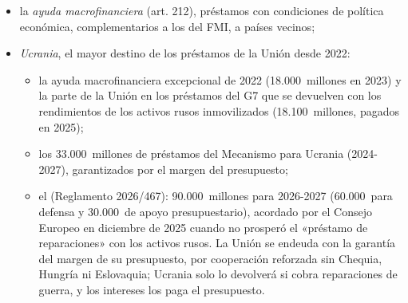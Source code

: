 \documentclass[11pt]{article}
\begin{document}
\begin{itemize}
\begin{itemize}
  \item la \emph{ayuda macrofinanciera} (art. 212), préstamos con condiciones de política económica, complementarios a los del FMI, a países vecinos;
  \item \emph{Ucrania}, el mayor destino de los préstamos de la Unión desde 2022:
    \begin{itemize}
    \item la ayuda macrofinanciera excepcional de 2022 (18.000~millones en 2023) y la parte de la Unión en los préstamos del G7 que se devuelven con los rendimientos de los activos rusos inmovilizados (18.100~millones, pagados en 2025);
    \item los 33.000~millones de préstamos del Mecanismo para Ucrania (2024-2027), garantizados por el margen del presupuesto;
    \item el  (Reglamento 2026/467): 90.000~millones para 2026-2027 (60.000~para defensa y 30.000~de apoyo presupuestario), acordado por el Consejo Europeo en diciembre de 2025 cuando no prosperó el «préstamo de reparaciones» con los activos rusos. La Unión se endeuda con la garantía del margen de su presupuesto, por cooperación reforzada sin Chequia, Hungría ni Eslovaquia; Ucrania solo lo devolverá si cobra reparaciones de guerra, y los intereses los paga el presupuesto\nocite{EPRS2026Ucrania}.
    \end{itemize}
  \end{itemize}
\end{itemize}
\end{document}
